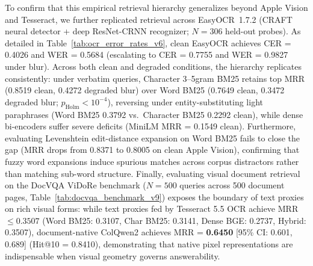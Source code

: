 \documentclass[conference]{IEEEtran}
\begin{document}
To confirm that this empirical retrieval hierarchy generalizes beyond Apple Vision and Tesseract, we further replicated retrieval across EasyOCR~1.7.2 (CRAFT neural detector + deep ResNet-CRNN recognizer; $N=306$ held-out probes). As detailed in Table~\ref{tab:ocr_error_rates_v6}, clean EasyOCR achieves CER = 0.4026 and WER = 0.5684 (escalating to CER = 0.7755 and WER = 0.9827 under blur). Across both clean and degraded conditions, the hierarchy replicates consistently: under verbatim queries, Character 3--5gram BM25 retains top MRR (0.8519 clean, 0.4272 degraded blur) over Word BM25 (0.7649 clean, 0.3472 degraded blur; $p_{\text{Holm}} < 10^{-4}$), reversing under entity-substituting light paraphrases (Word BM25 0.3792 vs.\ Character BM25 0.2292 clean), while dense bi-encoders suffer severe deficits (MiniLM MRR = 0.1549 clean). Furthermore, evaluating Levenshtein edit-distance expansion on Word BM25 fails to close the gap (MRR drops from 0.8371 to 0.8005 on clean Apple Vision), confirming that fuzzy word expansions induce spurious matches across corpus distractors rather than matching sub-word structure. Finally, evaluating visual document retrieval on the DocVQA ViDoRe benchmark ($N=500$ queries across 500 document pages, Table~\ref{tab:docvqa_benchmark_v9}) exposes the boundary of text proxies on rich visual forms: while text proxies fed by Tesseract 5.5 OCR achieve MRR $\le 0.3507$ (Word BM25: 0.3107, Char BM25: 0.3141, Dense BGE: 0.2737, Hybrid: 0.3507), document-native ColQwen2 achieves MRR = \textbf{0.6450} [95\% CI: 0.601, 0.689] (Hit@10 = 0.8410), demonstrating that native pixel representations are indispensable when visual geometry governs answerability.

\begin{table}[t]
\centering
\small
\caption{Third Public Dataset Evaluation: Retrieval Performance on the DocVQA Benchmark (ViDoRe Subsample) with 100\% Human-Written Questions Across Scanned Document Pages ($N=500$ Queries, $N=500$ Document Pages, 95\% Cluster Bootstrap CIs). Text proxies are generated via Tesseract 5.5 LSTM OCR.}
\label{tab:docvqa_benchmark_v9}
\end{table}
\end{document}
